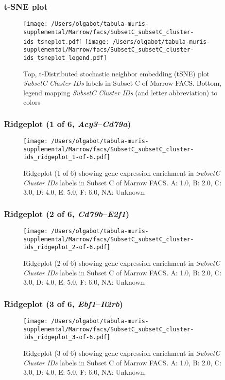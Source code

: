 \subsubsection{t-SNE plot}
\begin{figure}[h]
\centering
\texttt{[image: /Users/olgabot/tabula-muris-supplemental/Marrow/facs/SubsetC\_subsetC\_cluster-ids\_tsneplot.pdf]}
\texttt{[image: /Users/olgabot/tabula-muris-supplemental/Marrow/facs/SubsetC\_subsetC\_cluster-ids\_tsneplot\_legend.pdf]}
\caption{Top, t-Distributed stochastic neighbor embedding (tSNE) plot  \emph{SubsetC Cluster IDs} labels in Subset C of Marrow FACS. Bottom, legend mapping \emph{SubsetC Cluster IDs} (and letter abbreviation) to colors}
\end{figure}


\clearpage

\subsubsection{Ridgeplot (1 of 6, \emph{Acy3}--\emph{Cd79a})}
\begin{figure}[h]
\centering
\texttt{[image: /Users/olgabot/tabula-muris-supplemental/Marrow/facs/SubsetC\_subsetC\_cluster-ids\_ridgeplot\_1-of-6.pdf]}

\caption{ Ridgeplot (1 of 6)  showing gene expression enrichment in \emph{SubsetC Cluster IDs} labels in Subset C of Marrow FACS. A: 1.0, B: 2.0, C: 3.0, D: 4.0, E: 5.0, F: 6.0, NA: Unknown.}
\end{figure}


\clearpage

\subsubsection{Ridgeplot (2 of 6, \emph{Cd79b}--\emph{E2f1})}
\begin{figure}[h]
\centering
\texttt{[image: /Users/olgabot/tabula-muris-supplemental/Marrow/facs/SubsetC\_subsetC\_cluster-ids\_ridgeplot\_2-of-6.pdf]}

\caption{ Ridgeplot (2 of 6)  showing gene expression enrichment in \emph{SubsetC Cluster IDs} labels in Subset C of Marrow FACS. A: 1.0, B: 2.0, C: 3.0, D: 4.0, E: 5.0, F: 6.0, NA: Unknown.}
\end{figure}


\clearpage

\subsubsection{Ridgeplot (3 of 6, \emph{Ebf1}--\emph{Il2rb})}
\begin{figure}[h]
\centering
\texttt{[image: /Users/olgabot/tabula-muris-supplemental/Marrow/facs/SubsetC\_subsetC\_cluster-ids\_ridgeplot\_3-of-6.pdf]}

\caption{ Ridgeplot (3 of 6)  showing gene expression enrichment in \emph{SubsetC Cluster IDs} labels in Subset C of Marrow FACS. A: 1.0, B: 2.0, C: 3.0, D: 4.0, E: 5.0, F: 6.0, NA: Unknown.}
\end{figure}


